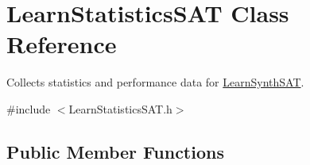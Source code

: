 \hypertarget{classLearnStatisticsSAT}{\section{Learn\-Statistics\-S\-A\-T Class Reference}
\label{classLearnStatisticsSAT}
}


Collects statistics and performance data for \hyperlink{classLearnSynthSAT}{Learn\-Synth\-S\-A\-T}.  




{\ttfamily \#include $<$Learn\-Statistics\-S\-A\-T.\-h$>$}

\subsection*{Public Member Functions}
